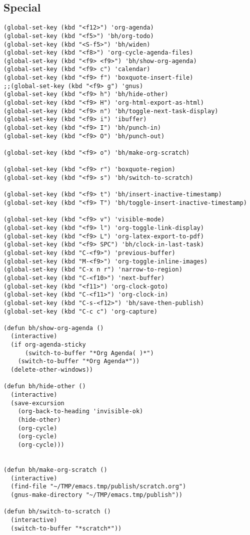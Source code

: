 \documentclass[11pt]{scrartcl}
\begin{document}
\subsection{Special}
\label{sec:orgheadline47}
\begin{verbatim}
(global-set-key (kbd "<f12>") 'org-agenda)
(global-set-key (kbd "<f5>") 'bh/org-todo)
(global-set-key (kbd "<S-f5>") 'bh/widen)
(global-set-key (kbd "<f8>") 'org-cycle-agenda-files)
(global-set-key (kbd "<f9> <f9>") 'bh/show-org-agenda)
(global-set-key (kbd "<f9> c") 'calendar)
(global-set-key (kbd "<f9> f") 'boxquote-insert-file)
;;(global-set-key (kbd "<f9> g") 'gnus)
(global-set-key (kbd "<f9> h") 'bh/hide-other)
(global-set-key (kbd "<f9> H") 'org-html-export-as-html)
(global-set-key (kbd "<f9> n") 'bh/toggle-next-task-display)
(global-set-key (kbd "<f9> i") 'ibuffer)
(global-set-key (kbd "<f9> I") 'bh/punch-in)
(global-set-key (kbd "<f9> O") 'bh/punch-out)

(global-set-key (kbd "<f9> o") 'bh/make-org-scratch)

(global-set-key (kbd "<f9> r") 'boxquote-region)
(global-set-key (kbd "<f9> s") 'bh/switch-to-scratch)

(global-set-key (kbd "<f9> t") 'bh/insert-inactive-timestamp)
(global-set-key (kbd "<f9> T") 'bh/toggle-insert-inactive-timestamp)

(global-set-key (kbd "<f9> v") 'visible-mode)
(global-set-key (kbd "<f9> l") 'org-toggle-link-display)
(global-set-key (kbd "<f9> L") 'org-latex-export-to-pdf)
(global-set-key (kbd "<f9> SPC") 'bh/clock-in-last-task)
(global-set-key (kbd "C-<f9>") 'previous-buffer)
(global-set-key (kbd "M-<f9>") 'org-toggle-inline-images)
(global-set-key (kbd "C-x n r") 'narrow-to-region)
(global-set-key (kbd "C-<f10>") 'next-buffer)
(global-set-key (kbd "<f11>") 'org-clock-goto)
(global-set-key (kbd "C-<f11>") 'org-clock-in)
(global-set-key (kbd "C-s-<f12>") 'bh/save-then-publish)
(global-set-key (kbd "C-c c") 'org-capture)

(defun bh/show-org-agenda ()
  (interactive)
  (if org-agenda-sticky
      (switch-to-buffer "*Org Agenda( )*")
    (switch-to-buffer "*Org Agenda*"))
  (delete-other-windows))

(defun bh/hide-other ()
  (interactive)
  (save-excursion
    (org-back-to-heading 'invisible-ok)
    (hide-other)
    (org-cycle)
    (org-cycle)
    (org-cycle)))


(defun bh/make-org-scratch ()
  (interactive)
  (find-file "~/TMP/emacs.tmp/publish/scratch.org")
  (gnus-make-directory "~/TMP/emacs.tmp/publish"))

(defun bh/switch-to-scratch ()
  (interactive)
  (switch-to-buffer "*scratch*"))
\end{verbatim}
\end{document}
